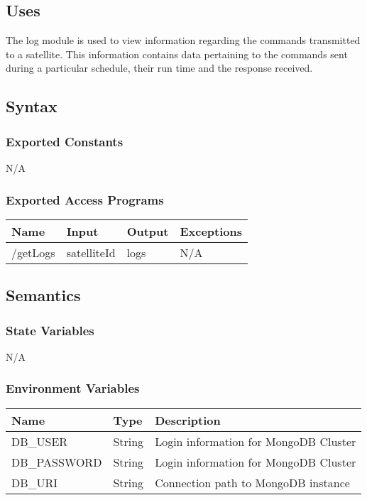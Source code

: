 \documentclass[12pt, titlepage]{article}
\begin{document}
\subsection{ Uses}

The log module is used to view information regarding the commands transmitted to a satellite. This information contains data pertaining to the commands sent during a particular schedule, their run time and the response received. 

\subsection{ Syntax}

\subsubsection{ Exported Constants}

N/A

\subsubsection{Exported Access Programs}
\begin{center}
\begin{tabular}{p{2cm} p{4cm} p{4cm} p{4cm}}
\hline
\textbf{Name} & \textbf{Input} & \textbf{Output} & \textbf{Exceptions} \\
\hline
/getLogs & satelliteId & logs & N/A \\
\hline

\end{tabular}

\end{center}

\subsection{ Semantics}

\subsubsection{ State Variables}

N/A

\subsubsection{ Environment Variables}

\begin{center}
\begin{tabular}{p{4cm} p{4cm} p{4cm}}
\hline
\textbf{Name} & \textbf{Type} & \textbf{Description} \\
\hline
DB\_USER & String& Login information for MongoDB Cluster \\
\hline
DB\_PASSWORD & String & Login information for MongoDB Cluster \\
\hline
DB\_URI & String & Connection path to MongoDB instance \\
\hline
\end{tabular}
\end{center}
\end{document}
